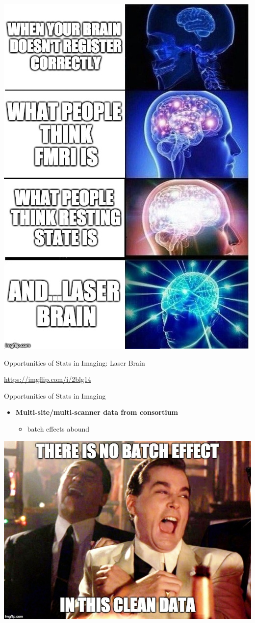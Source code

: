 \documentclass[ignorenonframetext,]{beamer}
\providecommand{\tightlist}{%
  \setlength{\itemsep}{0pt}\setlength{\parskip}{0pt}}
\begin{document}
\begin{frame}[fragile]

\leavevmode\hypertarget{left_col}{}%
\includegraphics[width=0.7\linewidth]{figure/laser_brain}

Opportunities of Stats in Imaging: Laser Brain

\url{https://imgflip.com/i/2blg14}

\begin{block}{Opportunities of Stats in Imaging}

\hypertarget{left_col}{}
\begin{itemize}
\tightlist
\item
  \textbf{Multi-site/multi-scanner data from consortium}

  \begin{itemize}
  \tightlist
  \item
    batch effects abound\\
  \end{itemize}
\end{itemize}

\hypertarget{right_col}{}
\includegraphics[width=1.2\linewidth]{figure/batch_effect}


\end{block}
\end{frame}
\end{document}
